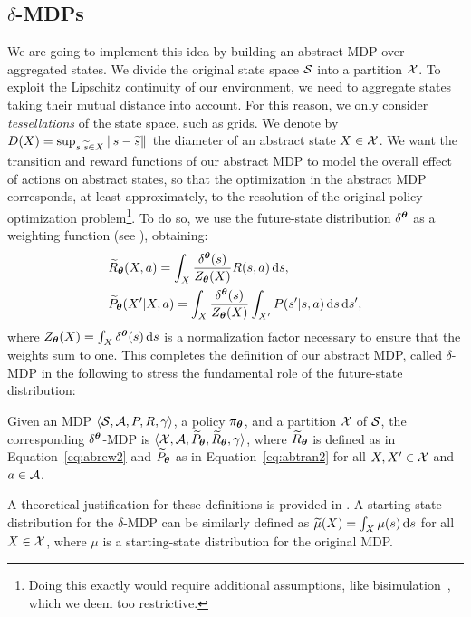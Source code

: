 \subsection{$\delta$-\ac{MDPs}}
We are going to implement this idea by building an abstract MDP over aggregated states. We divide the original state space $\mathcal{S}$ into a partition $\mathcal{X}$. To exploit the Lipschitz continuity of our environment, we need to aggregate states taking their mutual distance into account. For this reason, we only consider \textit{tessellations} of the state space, such as grids. 
%
We denote by $D(X) = \sup_{s,\widetilde{s}\in X}\left\|s-\widetilde{s}\right\|_{}$ the diameter of an abstract state $X\in\mathcal{X}$.
We want the transition and reward functions of our abstract MDP to model the overall effect of actions on abstract states, so that the optimization in the abstract MDP corresponds, at least approximately, to the resolution of the original policy optimization problem\footnote{Doing this exactly would require additional assumptions, like bisimulation~\citep{givan2003equivalence}, which we deem too restrictive.}. To do so, we use the future-state distribution $\delta^{\boldsymbol{\theta}}$ as a weighting function (see ), obtaining:
%
\begin{align}
	&\widetilde{R}_{\boldsymbol{\theta}}(X,a) = \int_{X}\frac{\delta^{\boldsymbol{\theta}}(s)}{Z_{\boldsymbol{\theta}}(X)}R(s,a)\,\mathrm{d} s,\label{eq:abrew2} \\
	&\widetilde{P}_{\boldsymbol{\theta}}(X'|X,a) = \int_{X} \frac{\delta^{\boldsymbol{\theta}}(s)}{Z_{\boldsymbol{\theta}}(X)} \int_{X'} P(s'|s,a)\,\mathrm{d} s\,\mathrm{d} s',\label{eq:abtran2}
\end{align}
%
where $Z_{\boldsymbol{\theta}}(X)=\int_{X}\delta^{\boldsymbol{\theta}}(s)\,\mathrm{d} s$ is a normalization factor necessary to ensure that the weights sum to one.
This completes the definition of our abstract MDP, called $\delta$-MDP in the following to stress the fundamental role of the future-state distribution:
%
\begin{definition}\label{def:abmdp}
	Given an MDP $\langle\mathcal{S}, \mathcal{A}, P, R, \gamma\rangle$, a policy $\pi_{\boldsymbol{\theta}}$, and a partition $\mathcal{X}$ of $\mathcal{S}$, the corresponding $\delta^{\boldsymbol{\theta}}$-MDP is $\langle\mathcal{X}, \mathcal{A}, \widetilde{P}_{\boldsymbol{\theta}}, \widetilde{R}_{\boldsymbol{\theta}}, \gamma\rangle$, where $\widetilde{R}_{\boldsymbol{\theta}}$ is defined as in Equation~\eqref{eq:abrew2} and $\widetilde{P}_{\boldsymbol{\theta}}$ as in Equation~\eqref{eq:abtran2} for all $X,X'\in\mathcal{X}$ and $a\in\mathcal{A}$.
\end{definition}
%
\noindent A theoretical justification for these definitions is provided in .
A starting-state distribution for the $\delta$-\ac{MDP} can be similarly defined as $\widetilde{\mu}(X) = \int_{X}\mu(s)\,\mathrm{d} s$ for all $X\in\mathcal{X}$, where $\mu$ is a starting-state distribution for the original \ac{MDP}.
